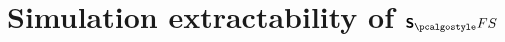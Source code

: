 \let\accentvec\vec \documentclass[runningheads,10pt]{llncs}
\begin{document}

\section{Simulation extractability of $\sonicprotfs$}
\end{document}
